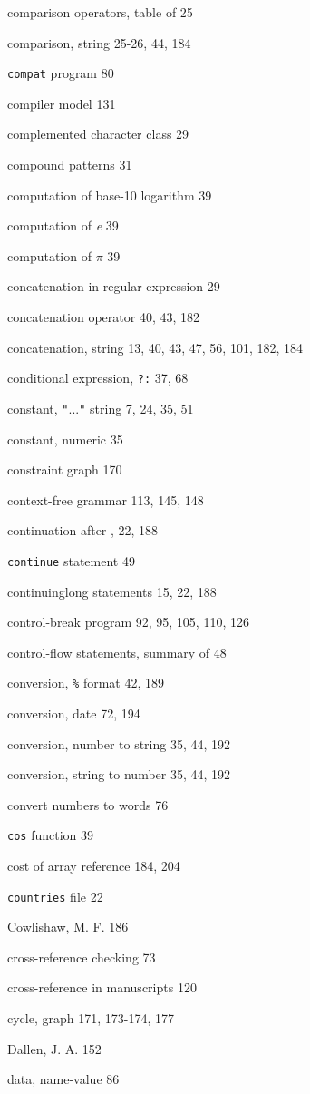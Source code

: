 \begin{multicols}{2}
comparison operators, table of 25

comparison, string 25-26, 44, 184

\verb'compat' program 80

compiler model 131

complemented character class 29

compound patterns 31

computation of base-10 logarithm 39

computation of \textit{e} 39

computation of $\pi$ 39

concatenation in regular expression 29

concatenation operator 40, 43, 182

concatenation, string 13, 40, 43, 47, 56, 101, 182, 184

conditional expression, \verb'?:' 37, 68

constant, \verb'"'...\verb'"' string 7, 24, 35, 51

constant, numeric 35

constraint graph 170

context-free grammar 113, 145, 148

continuation after , 22, 188

\verb'continue' statement 49

continuinglong statements 15, 22, 188

control-break program 92, 95, 105, 110, 126

control-flow statements, summary of 48

conversion, \verb'%' format 42, 189

conversion, date 72, 194

conversion, number to string 35, 44, 192

conversion, string to number 35, 44, 192

convert numbers to words 76

\verb'cos' function 39

cost of array reference 184, 204

\verb'countries' file 22

Cowlishaw, M. F. 186

cross-reference checking 73

cross-reference in manuscripts 120

cycle, graph 171, 173-174, 177

Dallen, J. A. 152

data, name-value 86


\end{multicols}
